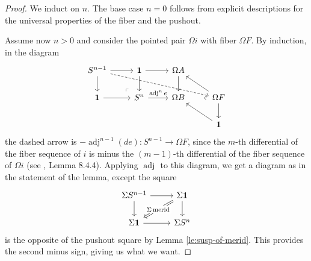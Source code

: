 \documentclass{amsart}
\theoremstyle{definition}
\newcommand{\merid}{\operatorname{merid}}
\newcommand{\adj}[1]{\operatorname{adj}^{#1}}
\newcommand{\sgtn}{\mathbf{1}}
\begin{document}
\begin{proof}
    We induct on $n$. The base case $n=0$ follows from explicit descriptions for the universal properties of the fiber and the pushout.

    Assume now $n>0$ and consider the pointed pair $\Omega i$ with fiber $\Omega F$. By induction, in the diagram
    \[
    \begin{tikzcd}
    	{S^{n-1}} & \sgtn & {\Omega A} \\
    	\sgtn & {S^{n}} & {\Omega B} & {\Omega F} \\
    	&&& \sgtn
    	\arrow[from=1-1, to=1-2]
    	\arrow[from=1-1, to=2-1]
    	\arrow[dashed, from=1-1, to=2-4]
    	\arrow[from=1-2, to=1-3]
    	\arrow[from=1-2, to=2-2]
    	\arrow[from=1-3, to=2-3]
    	\arrow[from=2-1, to=2-2]
    	\arrow["\lrcorner"{anchor=center, pos=0.125, rotate=180}, draw=none, from=2-2, to=1-1]
    	\arrow["{\adj{n}e}", from=2-2, to=2-3]
    	\arrow[from=2-4, to=1-3]
    	\arrow["\lrcorner"{anchor=center, pos=0.125, rotate=-135}, draw=none, from=2-4, to=2-3]
    	\arrow[from=2-4, to=3-4]
    	\arrow[from=3-4, to=2-3]
    \end{tikzcd}
    \]
    the dashed arrow is $-\adj{n-1}(de): S^{n-1} \to \Omega F$, since the $m$-th differential of the fiber sequence of $i$ is minus the $(m-1)$-th differential of the fiber sequence of $\Omega i$ (see \cite{UF}, Lemma 8.4.4). Applying $\adj{}$ to this diagram, we get a diagram as in the statement of the lemma, except the square
    \[
    \begin{tikzcd}
    	{\Sigma S^{n-1}} & {\Sigma \sgtn} \\
    	{\Sigma \sgtn} & {\Sigma S^n}
    	\arrow[from=1-1, to=1-2]
    	\arrow[from=1-1, to=2-1]
    	\arrow["{\Sigma \merid}"{description}, Rightarrow, from=1-2, to=2-1]
    	\arrow[from=1-2, to=2-2]
    	\arrow[from=2-1, to=2-2]
    \end{tikzcd}
    \]
    is the opposite of the pushout square by Lemma \ref{le:susp-of-merid}. This provides the second minus sign, giving us what we want.
\end{proof}
\end{document}
